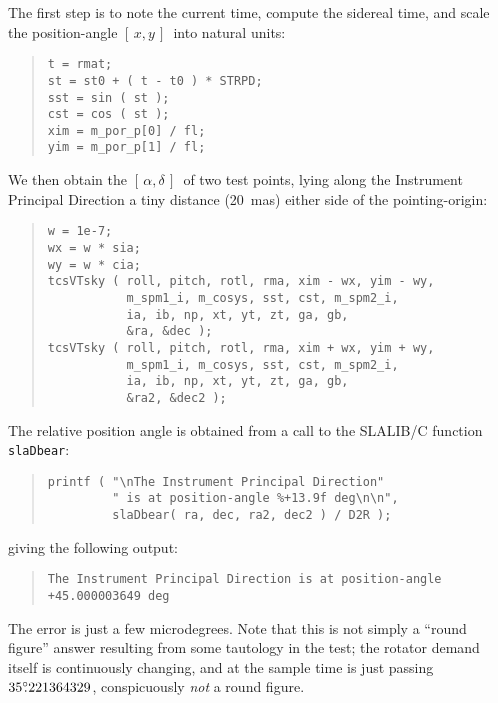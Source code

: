 \documentclass[12pt,fleqn,twoside]{article}
\renewcommand{\_}{{\tt\char'137}}     %
\newcommand{\radec}     {$[\,\alpha,\delta\,]$}
\newcommand{\xy}        {$[\,x,y\,]$}
\newcommand{\degree}[2] {$#1^{\circ}
                        \hspace{-0.35em}.\hspace{0.04em}#2$}
\begin{document}
The first step is to note the current time, compute the sidereal
time, and scale the position-angle \xy\ into natural units:
\begin{quote}
\begin{small}
\begin{verbatim}
t = rmat;
st = st0 + ( t - t0 ) * STRPD;
sst = sin ( st );
cst = cos ( st );
xim = m_por_p[0] / fl;
yim = m_por_p[1] / fl;
\end{verbatim}\end{small}
\end{quote}
We then obtain the \radec\ of two test points, lying along the Instrument
Principal Direction a tiny distance (20~mas) either side of
the pointing-origin:
\begin{quote}
\begin{small}
\begin{verbatim}
w = 1e-7;
wx = w * sia;
wy = w * cia;
tcsVTsky ( roll, pitch, rotl, rma, xim - wx, yim - wy,
           m_spm1_i, m_cosys, sst, cst, m_spm2_i,
           ia, ib, np, xt, yt, zt, ga, gb,
           &ra, &dec );
tcsVTsky ( roll, pitch, rotl, rma, xim + wx, yim + wy,
           m_spm1_i, m_cosys, sst, cst, m_spm2_i,
           ia, ib, np, xt, yt, zt, ga, gb,
           &ra2, &dec2 );
\end{verbatim}\end{small}
\end{quote}
The relative position angle is obtained from a call to the SLALIB/C
function {\tt slaDbear}:
\begin{quote}
\begin{small}
\begin{verbatim}
printf ( "\nThe Instrument Principal Direction"
         " is at position-angle %+13.9f deg\n\n",
         slaDbear( ra, dec, ra2, dec2 ) / D2R );
\end{verbatim}\end{small}
\end{quote}
giving the following output:
\begin{quote}
\begin{small}
\begin{small}
\begin{verbatim}
The Instrument Principal Direction is at position-angle +45.000003649 deg
\end{verbatim}\end{small}
\end{small}
\end{quote}
The error is just a few microdegrees.  Note that this is not simply a
``round figure'' answer resulting from some tautology
in the test; the rotator demand itself is continuously changing, and
at the sample time is just passing \degree{35}{221364329}, conspicuously
{\it not}\/ a round figure.
\end{document}

